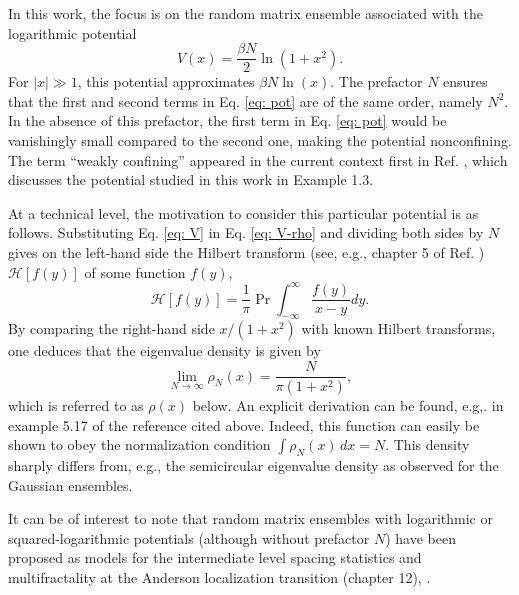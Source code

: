 \documentclass[aps, notitlepage, floatfix, pre, twocolumn]{revtex4-2}
\begin{document}
In this work, the focus is on the random matrix ensemble associated with the logarithmic potential
\begin{equation}
V(x) = \frac{\beta N}{2} \ln(1 + x^2).
\label{eq: V}
\end{equation}
For $|x| \gg 1$, this potential approximates $\beta N \ln(x)$. The prefactor $N$ ensures that the first and second terms in Eq. \eqref{eq: pot} are of the same order, namely $N^2$. In the absence of this prefactor, the first term in Eq. \eqref{eq: pot} would be vanishingly small compared to the second one, making the potential nonconfining. The term ``weakly confining'' appeared in the current context first in Ref. \cite{Hardy12}, which discusses the potential studied in this work in Example 1.3.

At a technical level, the motivation to consider this particular potential is as follows. Substituting Eq. \eqref{eq: V} in Eq. \eqref{eq: V-rho} and dividing both sides by $N$ gives on the left-hand side the Hilbert transform (see, e.g., chapter 5 of Ref. \cite{Liflyand21}) $\mathcal{H}[f(y)]$ of some function $f(y)$,
\begin{equation}
\mathcal{H}[f(y)] = \frac{1}{\pi} \Pr \int_{- \infty}^\infty \frac{f(y)}{x - y} dy.
\end{equation}
By comparing the right-hand side $x / (1 + x^2)$ with known Hilbert transforms, one deduces that the eigenvalue density is given by
\begin{equation}
\lim_{N \to \infty} \rho_N(x) = \frac{N}{\pi (1 + x^2)},
\end{equation}
which is referred to as $\rho(x)$ below. An explicit derivation can be found, e.g,. in example 5.17 of the reference cited above. Indeed, this function can easily be shown to obey the normalization condition $\int \rho_N(x) \, dx = N$. This density sharply differs from, e.g., the semicircular eigenvalue density as observed for the Gaussian ensembles.

It can be of interest to note that random matrix ensembles with logarithmic or squared-logarithmic potentials (although without prefactor $N$) have been proposed as models for the intermediate level spacing statistics and multifractality at the Anderson localization transition \cite{Akemann15} (chapter 12), \cite{Muttalib93, Evers08, Choi10, Vleeshouwers21}.



\end{document}
